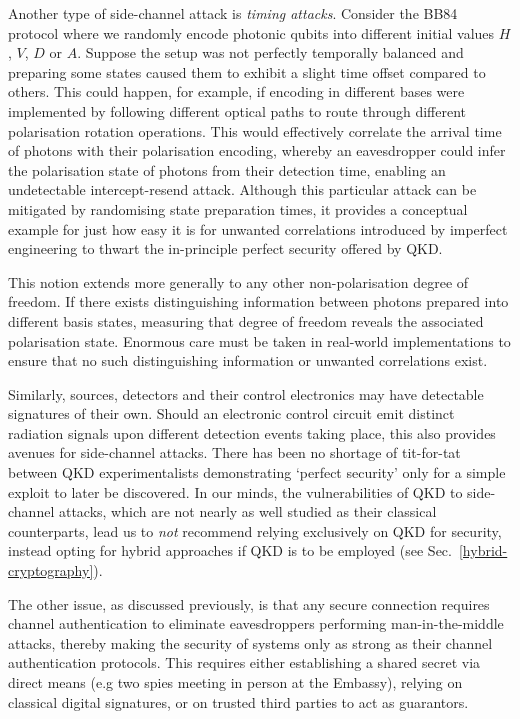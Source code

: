 Another type of side-channel attack is \emph{timing attacks}. Consider the BB84 protocol where we randomly encode photonic qubits into different initial values $H$, $V$, $D$ or $A$. Suppose the setup was not perfectly temporally balanced and preparing some states caused them to exhibit a slight time offset compared to others. This could happen, for example, if encoding in different bases were implemented by following different optical paths to route through different polarisation rotation operations. This would effectively correlate the arrival time of photons with their polarisation encoding, whereby an eavesdropper could infer the polarisation state of photons from their detection time, enabling an undetectable intercept-resend attack. Although this particular attack can be mitigated by randomising state preparation times, it provides a conceptual example for just how easy it is for unwanted correlations introduced by imperfect engineering to thwart the in-principle perfect security offered by QKD.

This notion extends more generally to any other non-polarisation degree of freedom. If there exists distinguishing information between photons prepared into different basis states, measuring that degree of freedom reveals the associated polarisation state. Enormous care must be taken in real-world implementations to ensure that no such distinguishing information or unwanted correlations exist.

Similarly, sources, detectors and their control electronics may have detectable signatures of their own. Should an electronic control circuit emit distinct radiation signals upon different detection events taking place, this also provides avenues for side-channel attacks. There has been no shortage of tit-for-tat between QKD experimentalists demonstrating `perfect security' only for a simple exploit to later be discovered. In our minds, the vulnerabilities of QKD to side-channel attacks, which are not nearly as well studied as their classical counterparts, lead us to \emph{not} recommend relying exclusively on QKD for security, instead opting for hybrid approaches if QKD is to be employed (see Sec.~\ref{hybrid-cryptography}).

The other issue, as discussed previously, is that any secure connection requires channel authentication to eliminate eavesdroppers performing man-in-the-middle attacks, thereby making the security of systems only as strong as their channel authentication protocols. This requires either establishing a shared secret via direct means (e.g two spies meeting in person at the Embassy), relying on classical digital signatures, or on trusted third parties to act as guarantors.

